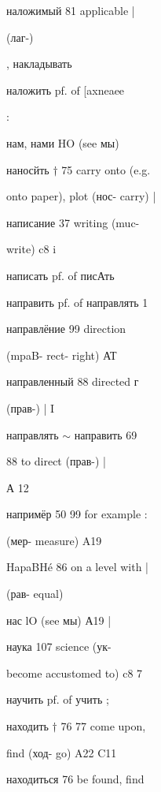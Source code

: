 \clearpage
\thispagestyle{plain}
\begingroup
\cyrillicfont
\fontsize{7.25}{8.25}\selectfont
\setlength{\parindent}{0pt}
\setlength{\parskip}{0pt}
\setlength{\emergencystretch}{1.5em}
\noindent
\begin{minipage}[t]{0.475\textwidth}
\raggedright
\noindent наложимый 81 applicable |\par
\noindent (лаг-)\par
\noindent , накладывать\par
\noindent наложить pf. of [axneaee\par
\noindent :\par
\noindent нам, нами HO (see мы)\par
\noindent наносйть $\dagger$ 75 carry onto (e.g.\par
\noindent onto paper), plot (нос- carry) |\par
\noindent написание 37 writing (muc-\par
\noindent write) c8 i\par
\noindent написать pf. of писАть\par
\noindent направить pf. of направлять 1\par
\noindent направлёние 99 direction\par
\noindent (mpaB- rect- right) АТ\par
\noindent направленный 88 directed г\par
\noindent (прав-) | I\par
\noindent направлять $\sim$ направить 69\par
{} 88 to direct (прав-) |\par
\noindent А 12\par
\noindent напримёр 50 99 for example :\par
\noindent (мер- measure) A19\par
\noindent HapaBHé 86 on a level with |\par
\noindent (рав- equal)\par
\noindent нас lO (see мы) А19 |\par
\noindent наука 107 science (ук-\par
\noindent become accustomed to) c8 7\par
\noindent научить pf. of учить ;\par
\noindent находить $\dagger$ 76 77 come upon,\par
\noindent find (ход- go) A22 C11\par
\noindent находиться 76 be found, find\par

\end{minipage}
